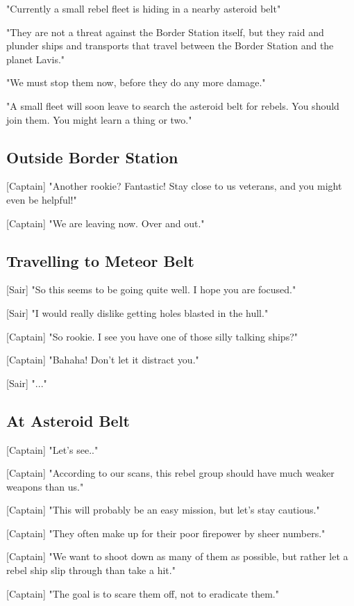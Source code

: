 \documentclass[a4paper,12pt]{article}
\begin{document}
"Currently a small rebel fleet is hiding in a nearby asteroid belt"

"They are not a threat against the Border Station itself, but they raid and plunder ships
and transports that travel between the Border Station and the planet Lavis."

"We must stop them now, before they do any more damage." 

"A small fleet will soon leave to search the asteroid belt for rebels. You should join them.
You might learn a thing or two."

\subsection{Outside Border Station}

[Captain] "Another rookie? Fantastic! Stay close to us veterans, and
you might even be helpful!" 

[Captain] "We are leaving now. Over and out."

\subsection{Travelling to Meteor Belt}

[Sair] "So this seems to be going quite well. I hope you are focused."

[Sair] "I would really dislike getting holes blasted in the hull."

[Captain] "So rookie. I see you have one of those silly talking ships?" 

[Captain] "Bahaha! Don't let it distract you."

[Sair] "..."

\subsection{At Asteroid Belt}

[Captain] "Let's see.." 

[Captain] "According to our scans, this rebel group should have much weaker weapons than us."

[Captain] "This will probably be an easy mission, but let's stay cautious."

[Captain] "They often make up for their poor firepower by sheer numbers."

[Captain] "We want to shoot down as many of them as possible, but rather let a rebel ship slip through than take a hit."

[Captain] "The goal is to scare them off, not to eradicate them."
\end{document}
